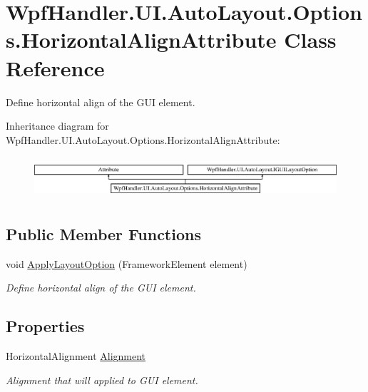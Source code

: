 \hypertarget{class_wpf_handler_1_1_u_i_1_1_auto_layout_1_1_options_1_1_horizontal_align_attribute}{}\section{Wpf\+Handler.\+U\+I.\+Auto\+Layout.\+Options.\+Horizontal\+Align\+Attribute Class Reference}
\label{class_wpf_handler_1_1_u_i_1_1_auto_layout_1_1_options_1_1_horizontal_align_attribute}


Define horizontal align of the G\+UI element.  


Inheritance diagram for Wpf\+Handler.\+U\+I.\+Auto\+Layout.\+Options.\+Horizontal\+Align\+Attribute\+:\begin{figure}[H]
\begin{center}
\leavevmode
\includegraphics[height=1.581921cm]{da/de4/class_wpf_handler_1_1_u_i_1_1_auto_layout_1_1_options_1_1_horizontal_align_attribute}
\end{center}
\end{figure}
\subsection*{Public Member Functions}
\begin{DoxyCompactItemize}
\item 
void \mbox{\hyperlink{class_wpf_handler_1_1_u_i_1_1_auto_layout_1_1_options_1_1_horizontal_align_attribute_a53335e3d47b8509f6ce67ad93044a760}{Apply\+Layout\+Option}} (Framework\+Element element)
\begin{DoxyCompactList}\small\item\em Define horizontal align of the G\+UI element. \end{DoxyCompactList}\end{DoxyCompactItemize}
\subsection*{Properties}
\begin{DoxyCompactItemize}
\item 
Horizontal\+Alignment \mbox{\hyperlink{class_wpf_handler_1_1_u_i_1_1_auto_layout_1_1_options_1_1_horizontal_align_attribute_a7e62bc68b5e19d0f8167a97146996b6c}{Alignment}}
\begin{DoxyCompactList}\small\item\em Alignment that will applied to G\+UI element. \end{DoxyCompactList}\end{DoxyCompactItemize}


